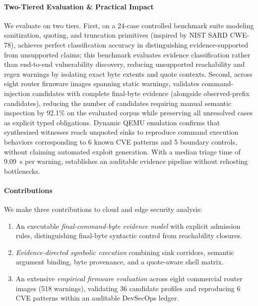 \paragraph{Two-Tiered Evaluation \& Practical Impact}
We evaluate \tool on two tiers. First, on a 24-case controlled benchmark suite modeling sanitization, quoting, and truncation primitives (inspired by NIST SARD CWE-78), \tool achieves perfect classification accuracy in distinguishing evidence-supported from unsupported claims; this benchmark evaluates evidence classification rather than end-to-end vulnerability discovery, reducing unsupported reachability and regex warnings by isolating exact byte extents and quote contexts. Second, across eight router firmware images spanning \TSDSReviewCampaignRecords{} static warnings, \tool validates \TSDSReviewCampaignCompleteDirect{} command-injection candidates with complete final-byte evidence (alongside \TSDSReviewCampaignObservedPrefixDirect{} observed-prefix candidates), reducing the number of candidates requiring manual semantic inspection by 92.1\% on the evaluated corpus while preserving all \TSDSReviewCampaignResidual{} unresolved cases as explicit typed obligations. Dynamic QEMU emulation confirms that synthesized witnesses reach unquoted sinks to reproduce command execution behaviors corresponding to 6 known CVE patterns and 5 boundary controls, without claiming automated exploit generation. With a median triage time of 9.09~s per warning, \tool establishes an auditable evidence pipeline without rehosting bottlenecks.

\paragraph{Contributions}
We make three contributions to cloud and edge security analysis:
\begin{enumerate}
  \item An executable \emph{final-command-byte evidence model} with explicit admission rules, distinguishing final-byte syntactic control from reachability closures.
  \item \emph{Evidence-directed symbolic execution} combining sink corridors, semantic argument binding, byte provenance, and a quote-aware shell matrix.
  \item An extensive \emph{empirical firmware evaluation} across eight commercial router images (518 warnings), validating 36 candidate profiles and reproducing 6 CVE patterns within an auditable DevSecOps ledger.
\end{enumerate}
